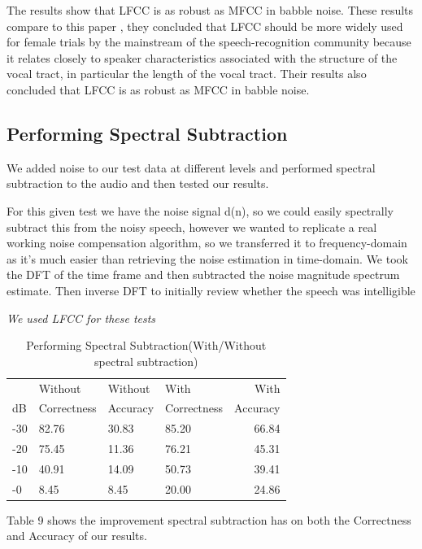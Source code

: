 \documentclass[	DIV=calc,%
							paper=a4,%
							fontsize=9.8pt,%
							twocolumn]{scrartcl}	 					%
\begin{document}
The results show that LFCC is as robust as MFCC in
babble noise. These results compare to this paper \cite{DBLP:conf/asru/ZhouGDES11} , they concluded that LFCC should be more widely used for female trials by the mainstream of the speech-recognition community because it relates closely to speaker characteristics associated with the structure of the vocal tract, in particular the length of the vocal tract. Their results also concluded that LFCC is as robust as MFCC in babble noise.


\subsection{Performing Spectral Subtraction}
We added noise to our test data at different levels and performed spectral subtraction to the audio and then tested our results.

 For this given test we have the noise signal d(n), so we could easily spectrally subtract this from the noisy speech, however we wanted to replicate a real working noise compensation algorithm, so we transferred it to frequency-domain as it's much easier than retrieving the noise estimation in time-domain. We took the DFT of the time frame and then subtracted the noise magnitude spectrum estimate. Then inverse DFT to initially review whether the speech was intelligible

 \textit{We used LFCC for these tests}

\begin{table}[h]
	\caption{Performing Spectral Subtraction(With/Without spectral subtraction)}
	\begin{tabular}{llllr}
	
	\cmidrule(r){1-5}
	\centering  & Without & Without & With & With\\
	dB &  Correctness &  Accuracy &  Correctness  & Accuracy  \\
	\midrule
	-30 & 82.76 & 30.83 & 85.20 & 66.84\\
	-20 & 75.45 & 11.36 & 76.21 & 45.31 \\
	-10 & 40.91 & 14.09 & 50.73 & 39.41 \\
	-0 & 8.45 & 8.45 & 20.00 & 24.86 \\
	
	
\end{tabular}
\end{table}

Table 9 shows the improvement spectral subtraction has on both the Correctness and Accuracy of our results.
\end{document}
